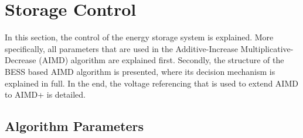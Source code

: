\section{Storage Control}
\label{ch4:sec:storage-control}

In this section, the control of the energy storage system is explained.
More specifically, all parameters that are used in the Additive-Increase Multiplicative-Decrease (AIMD) algorithm are explained first.
Secondly, the structure of the BESS based AIMD algorithm is presented, where its decision mechanism is explained in full.
In the end, the voltage referencing that is used to extend AIMD to AIMD+ is detailed.



\subsection{Algorithm Parameters}


